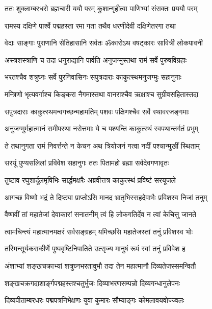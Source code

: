 \twolineshloka
{ततः शुक्लाम्बरधरो ब्रह्मचारी ययौ परम्}
{कुशान्गृहीत्वा पाणिभ्यां संसक्तः प्रययौ परम्}%

\twolineshloka
{रामस्य दक्षिणे पार्श्वे पद्महस्ता रमा गता}
{तथैव धरणीदेवी दक्षिणेतरगा तथा}%

\twolineshloka
{वेदाः साङ्गाः पुराणानि सेतिहासानि सर्वतः}
{ॐकारोऽथ वषट्कारः सावित्री लोकपावनी}%

\twolineshloka
{अस्त्रशस्त्राणि च तदा धनुराद्यानि पार्वति}
{अनुजग्मुस्तथा रामं सर्वे पुरुषविग्रहाः}%

\twolineshloka
{भरतश्चैव शत्रुघ्नः सर्वे पुरनिवासिनः}
{सपुत्रदाराः काकुत्स्थमनुजग्मुः सहानुगाः}%

\twolineshloka
{मन्त्रिणो भृत्यवर्गाश्च किङ्करा नैगमास्तथा}
{वानराश्चैव ऋक्षाश्च सुग्रीवसहितास्तदा}%

\twolineshloka
{सपुत्रदाराः काकुत्स्थमन्वगच्छन्महामतिम्}
{पशवः पक्षिणश्चैव सर्वे स्थावरजङ्गमाः}%

\twolineshloka
{अनुजग्मुर्महात्मानं समीपस्था नरोत्तमाः}
{ये च पश्यन्ति काकुत्स्थं स्वपथान्तर्गतं प्रभुम्}%

\twolineshloka
{ते तथानुगता रामं निवर्त्तन्ते न केचन}
{अथ त्रियोजनं गत्वा नदीं पश्चान्मुखीं स्थिताम्}%

\twolineshloka
{सरयूं पुण्यसलिलां प्रविवेश सहानुगः}
{ततः पितामहो ब्रह्मा सर्वदेवगणावृतः}%

\twolineshloka
{तुष्टाव रघुशार्दूलमृषिभिः सार्द्धमक्षरैः}
{अब्रवीत्तत्र काकुत्स्थं प्रविष्टं सरयूजले}%


\twolineshloka
{आगच्छ विष्णो भद्रं ते दिष्ट्या प्राप्तोऽसि मानद}
{भ्रातृभिस्सहदेवाभैः प्रविशस्व निजां तनुम्}%

\twolineshloka
{वैष्णवीं तां महातेजां देवाकारां सनातनीम्}
{त्वं हि लोकगतिर्देव न त्वां केचित्तु जानते}%

\twolineshloka
{त्वामचिन्त्यं महात्मानमक्षरं सर्वसङ्ग्रहम्}
{यमिच्छसि महातेजस्तां तनुं प्रविशस्व भोः}%


\twolineshloka
{तस्मिन्सूर्यकराकीर्णे पुष्पवृष्टिनिपातिते}
{उत्सृज्य मानुषं रूपं स्वां तनुं प्रविवेश ह}%

\twolineshloka
{अंशाभ्यां शङ्खचक्राभ्यां शत्रुघ्नभरतावुभौ}
{तदा तेन महात्मानौ दिव्यतेजस्समन्वितौ}%

\twolineshloka
{शङ्खचक्रगदाशार्ङ्गपद्महस्तश्चतुर्भुजः}
{दिव्याभरणसम्पन्नो दिव्यगन्धानुलेपनः}%

\twolineshloka
{दिव्यपीताम्बरधरः पद्मपत्रनिभेक्षणः}
{युवा कुमारः सौम्याङ्गः कोमलावयवोज्ज्वलः}%

